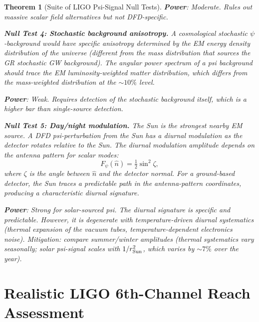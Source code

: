 \documentclass[11pt]{article}
\newtheorem{theorem}{Theorem}[section]
\theoremstyle{definition}
\theoremstyle{remark}
\begin{document}
\begin{theorem}[Suite of LIGO Psi-Signal Null Tests]
\textbf{Power}: Moderate. Rules out massive scalar field alternatives
but not DFD-specific.

\textbf{Null Test 4: Stochastic background anisotropy.}
A cosmological stochastic $\psi$-background would have specific
anisotropy determined by the EM energy density distribution of the
universe (different from the mass distribution that sources the GR
stochastic GW background). The angular power spectrum of a psi
background should trace the EM luminosity-weighted matter distribution,
which differs from the mass-weighted distribution at the
$\sim 10\%$ level.

\textbf{Power}: Weak. Requires detection of the stochastic background
itself, which is a higher bar than single-source detection.

\textbf{Null Test 5: Day/night modulation.}
The Sun is the strongest nearby EM source. A DFD psi-perturbation
from the Sun has a diurnal modulation as the detector rotates
relative to the Sun. The diurnal modulation amplitude depends on
the antenna pattern for scalar modes:
\begin{equation}
F_\psi(\hat{n}) = \tfrac{1}{2}\sin^2\zeta,
\end{equation}
where $\zeta$ is the angle between $\hat{n}$ and the detector normal.
For a ground-based detector, the Sun traces a predictable path
in the antenna-pattern coordinates, producing a characteristic
diurnal signature.

\textbf{Power}: Strong for solar-sourced psi. The diurnal signature
is specific and predictable. However, it is degenerate with
temperature-driven diurnal systematics (thermal expansion of the
vacuum tubes, temperature-dependent electronics noise).
Mitigation: compare summer/winter amplitudes (thermal systematics
vary seasonally; solar psi-signal scales with $1/r_{\rm Sun}^2$,
which varies by $\sim 7\%$ over the year).
\end{theorem}

\section{Realistic LIGO 6th-Channel Reach Assessment}
\label{sec:ligo_realistic}
\end{document}
